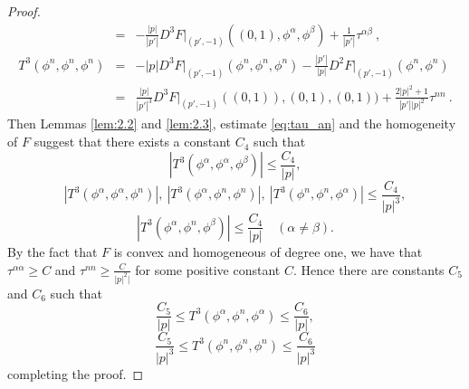 \documentclass[10pt,a4paper]{amsart}
\begin{document}
\begin{proof}
\begin{eqnarray*}
    & = &  - \frac{|p|}{|p'|} D^3 F\Big|_{(p',-1)} ((0,1),\phi^{\alpha}, \phi^{\beta}) + \frac{1}{|p'|} \tau^{\alpha \beta} \ , \\
   T^3 (\phi^{n}, \phi^{n}, \phi^n) & = &  -|p| D^3 F\Big|_{(p',-1)} (\phi^n, \phi^n, \phi^n ) - \frac{|p'|}{|p|} D^2 F\Big|_{(p',-1)} (\phi^n, \phi^n ) \\
   & = & \frac{|p|}{|p'|^3} D^3 F\Big|_{(p',-1)} ((0,1)), (0,1), (0,1)) + \frac{2|p|^2 + 1}{|p'| |p|^2} \tau^{n n} \ . 
\end{eqnarray*}
Then Lemmas \ref{lem:2.2} and \ref{lem:2.3}, estimate \eqref{eq:tau_an} and the
homogeneity of $F$ suggest that there exists a constant $C_4$ such that 
\begin{equation*}
    |T^3 (\phi^{\alpha}, \phi^{\alpha}, \phi^{\beta})| \leq \frac{C_4}{|p|},
\end{equation*}
\begin{equation*}
     |T^3 (\phi^{\alpha}, \phi^{\alpha}, \phi^{n})|,\ |T^3 (\phi^{\alpha}, \phi^n, \phi^n)|, \ |T^3 (\phi^{n}, \phi^{n}, \phi^{\alpha})| \leq \frac{C_4}{|p|^3},
\end{equation*}
\begin{equation*}
    | T^3 (\phi^{\alpha}, \phi^n, \phi^{\beta})| \leq \frac{C_4}{|p|} \quad (\alpha\neq \beta).
\end{equation*}
By the fact that $F$ is convex and homogeneous of degree one, we have that 
$ \tau^{\alpha \alpha}\geq C$ and $\tau^{n n}\geq \frac{C}{|p|^2|}$ for some positive constant $C$.
Hence there are constants $C_5$ and $C_6$ such that
\begin{equation*}
    \frac{C_5}{|p|} \leq T^3 (\phi^{\alpha}, \phi^n, \phi^{\alpha}) \leq \frac{C_6}{|p|},
\end{equation*}
\begin{equation*}
    \frac{C_5}{|p|^3} \leq T^3 (\phi^{n}, \phi^{n}, \phi^n)  \leq \frac{C_6}{|p|^3}
\end{equation*}
completing the proof.
\end{proof}
\end{document}
